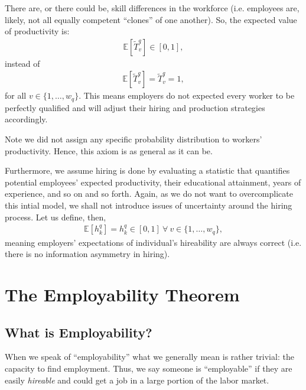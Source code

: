 \documentclass[hidelinks, nonatbib]{elsarticle}
\begin{document}
\begin{axiom}
    There are, or there could be, skill differences in the workforce (i.e. employees are, likely, not all equally competent ``clones'' of one another). So, the expected value of productivity is:
    \begin{gather}
        \mathbb{E}[
            \tilde{T}_{v}^{q}
        ]
        \in
        [0,1]
        ,
    \end{gather}
    instead of 
    \begin{gather}
        \mathbb{E}[
            \tilde{T}_{v}^{q}
        ]
        =
        \tilde{T}_{v}^{q}
        = 1
        ,
    \end{gather}
    for all $v \in \{1, \dots, w_q\}$. This means employers do not expected every worker to be perfectly qualified and will adjust their hiring and production strategies accordingly.
    
    Note we did not assign any specific probability distribution to workers' productivity. Hence, this axiom is as general as it can be.
\end{axiom}

\begin{axiom}
    \label{ha}
    Furthermore, we assume hiring is done by evaluating a statistic that quantifies potential employees' expected productivity, their educational attainment, years of experience, and so on and so forth. Again, as we do not want to overcomplicate this intial model, we shall not introduce issues of uncertainty around the hiring process. Let us define, then,
    \begin{gather}
        \mathbb{E}[h_{k}^{q}]
        =
        h_{k}^{q}
        \in
        [0,1]
        \
        \forall
        \
        v \in \{1, \dots, w_q\}
        ,
    \end{gather}
    meaning employers' expectations of individual's hireability are always correct (i.e. there is no information asymmetry in hiring).
\end{axiom}

\section{The Employability Theorem}
\subsection{What is Employability?}
When we speak of ``employability'' what we generally mean is rather trivial: the capacity to find employment. Thus, we say someone is ``employable'' if they are easily \textit{hireable} and could get a job in a large portion of the labor market.
\end{document}
